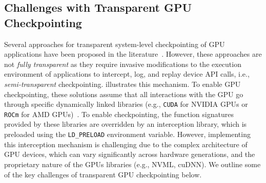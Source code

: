 \subsection{Challenges with Transparent GPU Checkpointing}%
Several approaches for transparent system-level checkpointing of GPU applications have been proposed in the literature~\cite{takizawa2009checuda,nukada2011nvcr,jain2020crac,shukla2022singularity,eiling2022cricket,eiling2023checkpoint}. However, these approaches are not \textit{fully transparent} as they require invasive modifications to the execution environment of applications to intercept, log, and replay device API calls, i.e., \textit{semi-transparent} checkpointing.  illustrates this mechanism. To enable GPU checkpointing, these solutions assume that all interactions with the GPU go through specific dynamically linked libraries (e.g., \texttt{CUDA} for NVIDIA GPUs or \texttt{ROCm} for AMD GPUs)~\cite{shukla2022singularity,eiling2022cricket}. To enable checkpointing, the function signatures provided by these libraries are overridden by an interception library, which is preloaded using the \texttt{LD\_PRELOAD} environment variable. However, implementing this interception mechanism is challenging due to the complex architecture of GPU devices, which can vary significantly across hardware generations, and the proprietary nature of the GPUs libraries (e.g., NVML, cuDNN). We outline some of the key challenges of transparent GPU checkpointing below.

